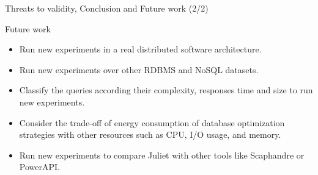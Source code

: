 \documentclass{beamer}
\begin{document}
\begin{frame}{Threats to validity, Conclusion and Future work (2/2)}

\begin{block} {Future work}
         \begin{itemize}
             \small
             \item Run new experiments in a real distributed software architecture.
             \item Run new experiments
             over other RDBMS and NoSQL datasets.
             \item Classify the queries according their complexity, responses time and size to run new experiments.
             \item Consider the trade-off of energy consumption of database optimization strategies with other resources such as CPU, I/O usage, and memory. 
             \item Run new experiments to compare Juliet with other tools like Scaphandre or PowerAPI. 
         \end{itemize}
\end{block}

\end{frame}
\end{document}
